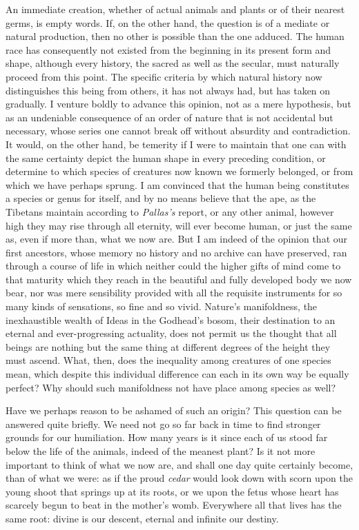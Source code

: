 \documentclass[12pt,a4paper,openany]{book}
\newcommand{\opage}[1]{\marginnote{\footnotesize\textit{[#1]}}}
\begin{document}
An immediate creation, whether of actual animals and plants or of their nearest
germs, is empty words. If, on the other hand, the question is of a mediate or
natural production, then no other is possible than the one adduced. The human race
has consequently not existed from the beginning in its present form and shape,
although every history, the sacred as well as the secular, must naturally proceed
from this point. The specific criteria by which natural history now distinguishes
this being from others, it has not always had, but has taken on gradually. I venture
boldly to advance this opinion, not as a mere hypothesis, but as an undeniable
consequence of an order of nature that is not accidental but necessary, whose series
one cannot break off without absurdity and contradiction. It would, on the other
hand, be temerity if I were to maintain that one can with the same certainty depict
the human shape in every preceding condition, or determine to which species of
creatures now known we formerly belonged, or from which we have perhaps sprung. I am
convinced
\setcounter{footnote}{0}%
\opage{113}that the human being constitutes a species or genus for itself, and by no means
believe that the ape, as the Tibetans maintain according to \emph{Pallas's} report, or
any other animal, however high they may rise through all eternity, will ever become
human, or just the same as, even if more than, what we now are. But I am indeed of
the opinion that our first ancestors, whose memory no history and no archive can
have preserved, ran through a course of life in which neither could the higher gifts
of mind come to that maturity which they reach in the beautiful and fully developed
body we now bear, nor was mere sensibility provided with all the requisite
instruments for so many kinds of sensations, so fine and so vivid. Nature's
manifoldness, the inexhaustible wealth of Ideas in the Godhead's bosom, their
destination to an eternal and ever-progressing actuality, does not permit us the
thought that all beings are nothing but the same thing at different degrees of the
height they must ascend. What, then, does the inequality among creatures of one
species mean, which despite this individual difference can each in its own way be
equally perfect? Why should such manifoldness not have place among species as well?

Have we perhaps reason to be ashamed of such an origin? This question can be
answered quite briefly. We need not go so far back in time to find stronger grounds
for our humiliation. How many years is it since each of us stood far below the life
of the animals, indeed of the meanest plant? Is it not more important to think of
what we now are, and shall one day quite certainly become, than of what we were: as
if the proud \emph{cedar} would look down with scorn upon the young shoot that
springs up at its roots, or we upon the fetus whose heart has scarcely begun to beat
in the mother's womb. Everywhere all that lives has the same root: divine is our
descent, eternal and infinite our destiny.
\end{document}
